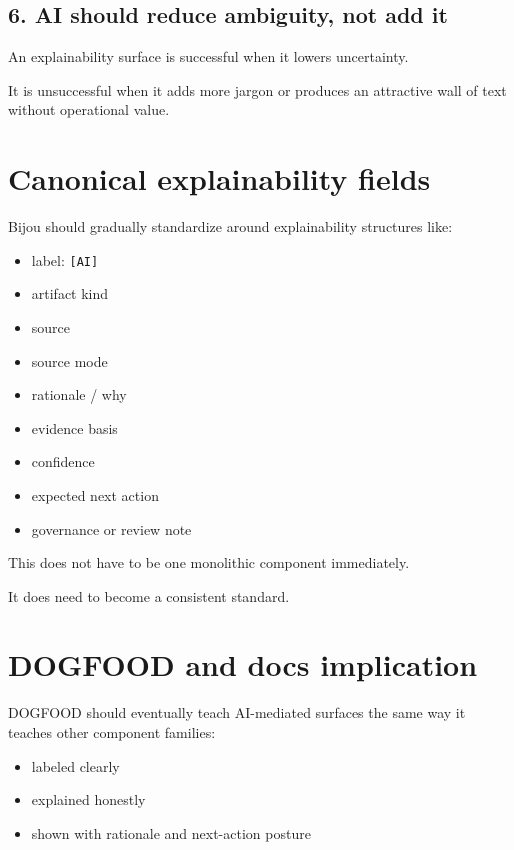 \subsection{6. AI should reduce ambiguity, not add it}\label{record-033-ai-should-reduce-ambiguity-not-add-it}

An explainability surface is successful when it lowers uncertainty.

It is unsuccessful when it adds more jargon or produces an attractive wall of text without operational value.

\section{Canonical explainability fields}\label{record-033-canonical-explainability-fields}

Bijou should gradually standardize around explainability structures like:

\begin{itemize}
\tightlist
\item
  label: \texttt{[\allowbreak{}A\allowbreak{}I\allowbreak{}]}
\item
  artifact kind
\item
  source
\item
  source mode
\item
  rationale / why
\item
  evidence basis
\item
  confidence
\item
  expected next action
\item
  governance or review note
\end{itemize}

This does not have to be one monolithic component immediately.

It does need to become a consistent standard.

\section{DOGFOOD and docs implication}\label{record-033-dogfood-and-docs-implication}

DOGFOOD should eventually teach AI-mediated surfaces the same way it teaches other component families:

\begin{itemize}
\tightlist
\item
  labeled clearly
\item
  explained honestly
\item
  shown with rationale and next-action posture
\end{itemize}


